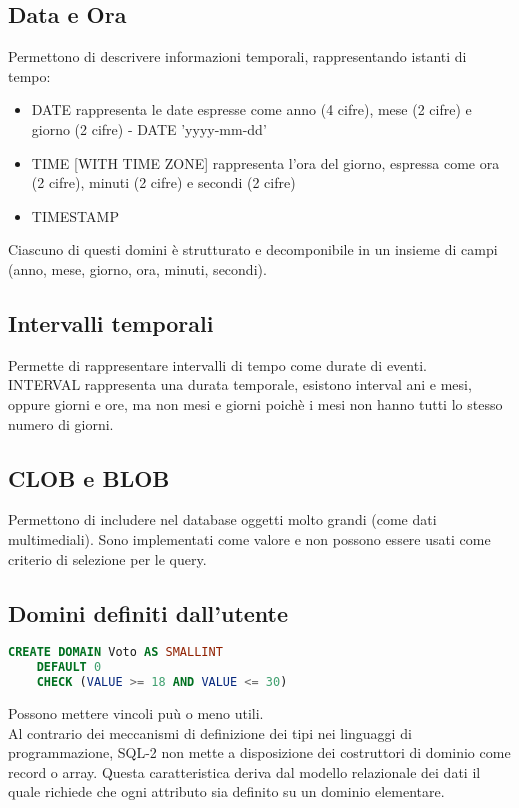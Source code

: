 \subsection{Data e Ora}
Permettono di descrivere informazioni temporali, rappresentando istanti di tempo:
\begin{itemize}
  \item DATE rappresenta le date espresse come anno (4 cifre), mese (2 cifre) e giorno (2 cifre)
  - DATE 'yyyy-mm-dd'
  \item TIME [WITH TIME ZONE] rappresenta l'ora del giorno, espressa come ora (2 cifre), 
  minuti (2 cifre) e secondi (2 cifre)
  \item TIMESTAMP
\end{itemize}
Ciascuno di questi domini è strutturato e decomponibile in un insieme di campi 
(anno, mese, giorno, ora, minuti, secondi).
\subsection{Intervalli temporali}
Permette di rappresentare intervalli di tempo come durate di eventi.\\
INTERVAL rappresenta una durata temporale, esistono interval ani e mesi, oppure
giorni e ore, ma non mesi e giorni poichè i mesi non hanno tutti lo stesso numero di
giorni.
\subsection{CLOB e BLOB}
Permettono di includere nel database oggetti molto grandi (come dati multimediali).
Sono implementati come valore e non possono essere usati come criterio di selezione per le
query.
\subsection{Domini definiti dall'utente}
\begin{lstlisting}[language=SQL]
  CREATE DOMAIN Voto AS SMALLINT
    DEFAULT 0
    CHECK (VALUE >= 18 AND VALUE <= 30)
\end{lstlisting}
Possono mettere vincoli puù o meno utili.\\
Al contrario dei meccanismi di definizione dei tipi nei linguaggi di programmazione,
SQL-2 non mette a disposizione dei costruttori di dominio come record o array. Questa 
caratteristica deriva dal modello relazionale dei dati il quale richiede che ogni
attributo sia definito su un dominio elementare.
